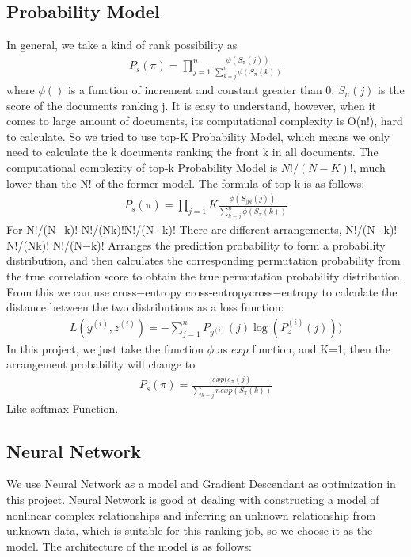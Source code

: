 \documentclass{acmtog} %
\begin{document}
\subsection{Probability Model}
In general, we take a kind of rank possibility as 
\begin{eqnarray}
  P_s(\pi)= \prod_{j=1}^{n} \frac{\phi(S_{\pi}(j))}{\sum_{k=j}^n \phi(S_{\pi}(k))}
\end{eqnarray}
where $\phi()$ is a function of increment and constant greater than 0, $S_n(j)$ is the score of the documents ranking j. It is easy to understand, however, when it comes to large amount of documents, its computational complexity is O(n!), hard to calculate. So we tried to use top-K Probability Model, which means we only need to calculate the k documents ranking the front k in all documents. The computational complexity of top-k Probability Model is $N!/(N-K)!$, much lower than the N! of the former model. The formula of top-k is as follows:
\begin{eqnarray}
  P_s(\pi)=\prod_{j=1}{K}\frac{\phi(S_{]pi}(j))}{\sum_{k=j}^{n}\phi(S_{\pi}(k))}
\end{eqnarray}
For N!/(N−k)! N!/(Nk)!N!/(N−k)! There are different arrangements, N!/(N−k)! N!/(Nk)! N!/(N−k)! Arranges the prediction probability to form a probability distribution, and then calculates the corresponding permutation probability from the true correlation score to obtain the true permutation probability distribution. From this we can use cross−entropy cross-entropycross−entropy to calculate the distance between the two distributions as a loss function:
\begin{eqnarray}
  L(y^{(i)},z^{(i)})=-\sum_{j=1}^nP_{y^{(i)}}(j)\log(P_z^{(i)}(j)))
\end{eqnarray}
In this project, we just take the function $\phi$ as $exp$ function, and K=1, then the arrangement probability will change to 
\begin{eqnarray}
  P_s(\pi)=\frac{exp(s_{\pi}(j)}{\sum_{k=j}{n} exp(S_{\pi}(k))}
\end{eqnarray}
Like softmax Function.

\subsection{Neural Network}
We use Neural Network as a model and Gradient Descendant as optimization in this project. Neural Network is good at dealing with constructing a model of nonlinear complex relationships and inferring an unknown relationship from unknown data, which is suitable for this ranking job, so we choose it as the model. The architecture of the model is as follows:
\end{document}
